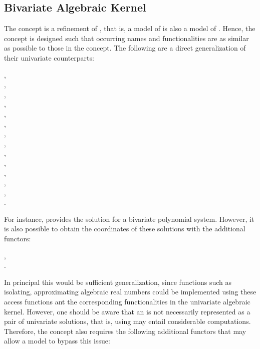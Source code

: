 \subsection{Bivariate Algebraic Kernel}

The concept   is a refinement of , 
that is, a model of   is also a model of . 
Hence, the  concept is designed such that occurring 
names and functionalities are as similar as possible to those in the 
 concept.
The following are a direct generalization of their univariate counterparts: 

,\\
,\\
,\\
,\\
,\\
,\\
,\\
,\\
,\\
,\\
,\\
,\\
,\\
.

For instance, 
provides the solution for a bivariate polynomial system. 
However, it is also possible to obtain the coordinates of these 
solutions with the additional functors: 

,\\
.

In principal this would be sufficient generalization, 
since functions such as isolating, approximating algebraic real numbers 
could be implemented using these access functions ant 
the corresponding functionalities in the univariate algebraic kernel. 
However, one should be aware that an  
is not necessarily represented as a pair of univariate solutions, that is, 
using  may entail considerable 
computations. Therefore, the concept also requires the following 
additional functors that may allow a model to bypass this issue:

